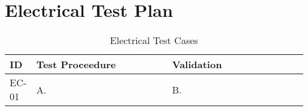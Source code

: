 

\setcounter{section}{3}
\section{Electrical Test Plan}
\bigskip





\bigskip
\bgroup
\def\arraystretch{1.25}
\begin{table}[h!]
    \centering
    \begin{tabular}{|m{0.075\linewidth}|m{0.45\linewidth}|m{0.45\linewidth}|} 
    \hline
    ID & Test Proceedure & Validation\\ 

    \hline
    EC-01
    & A.  
    & B. \\ 
    \hline    





    \hline
    \end{tabular}
    \caption{Electrical Test Cases}
\end{table}
